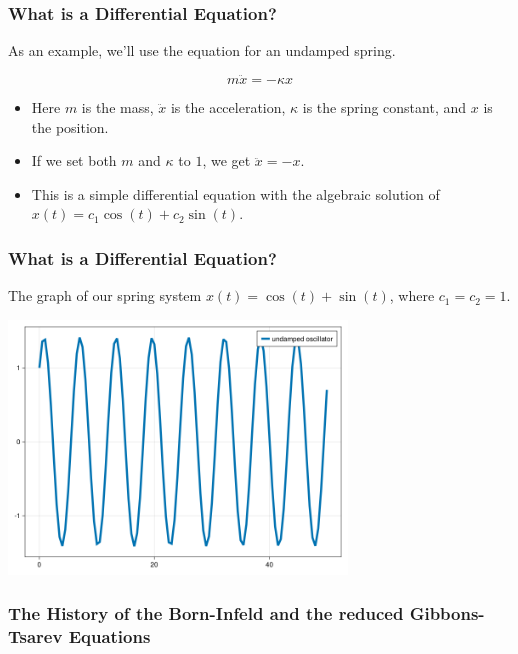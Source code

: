 \documentclass{beamer}
\begin{document}
\begin{frame}
    \frametitle{What is a Differential Equation?}
    As an example, we'll use the equation for an undamped spring.\\
    \vspace*{0.125in}
    \begin{Large}
        $$m\ddot{x}=-\kappa{x}$$
    \end{Large}
    \vspace*{0.25in}
    \begin{itemize}
        \item Here $m$ is the mass, $\ddot{x}$ is the acceleration, $\kappa$ is the spring constant, and $x$ is the position.
        \item If we set both $m$ and $\kappa$ to $1$, we get $\ddot{x}=-x$.
        \item This is a simple differential equation with the algebraic solution of $x(t)=c_1\cos(t)+c_2\sin(t)$.
    \end{itemize}
\end{frame}


\begin{frame}
    \frametitle{What is a Differential Equation?}
    The graph of our spring system $x(t)=\cos(t)+\sin(t)$, where $c_1=c_2=1$.\\
    \begin{center}
        \includegraphics[width=9cm]{undamped.png}
    \end{center}
\end{frame}


\begin{frame}
    \frametitle{The History of the Born-Infeld and the reduced Gibbons-Tsarev Equations}

\end{frame}
\end{document}
